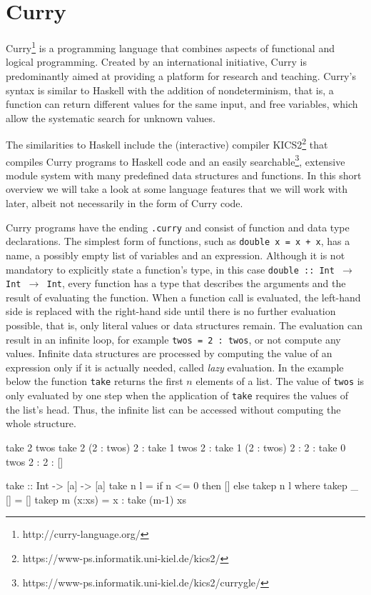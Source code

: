 \documentclass[paper = a4, fleqn, abstract=on, twoside]{scrreprt}
\begin{document}
\section{Curry}
Curry\footnote{http://curry-language.org/} is a programming language that combines aspects of functional and logical programming. Created by an international initiative, Curry is predominantly aimed at providing a platform for research and teaching.\cite{curryintro} Curry's syntax is similar to Haskell with the addition of nondeterminism, that is, a function can return different values for the same input, and free variables, which allow the systematic search for unknown values.
\par
The similarities to Haskell include the (interactive) compiler KICS2\footnote{https://www-ps.informatik.uni-kiel.de/kics2/} that compiles Curry programs to Haskell code and  an easily searchable\footnote{https://www-ps.informatik.uni-kiel.de/kics2/currygle/}, extensive module system with many predefined data structures and functions. In this short overview we will take a look at some language features that we will work with later, albeit not necessarily in the form of Curry code.\\
\par\noindent
Curry programs have the ending \texttt{.curry} and consist of function and data type declarations. The simplest form of functions, such as \texttt{double x = x + x}, has a name, a possibly empty list of variables and an expression. Although it is not mandatory to explicitly state a function's type, in this case \texttt{double :: Int $\rightarrow$ Int $\rightarrow$ Int}, every function has a type that describes the arguments and the result of evaluating the function. When a function call is evaluated, the left-hand side is replaced with the right-hand side until there is no further evaluation possible, that is, only literal values or data structures remain. The evaluation can result in an infinite loop, for example \texttt{twos = 2 : twos}, or not compute any values. Infinite data structures are processed by computing the value of an expression only if it is actually needed, called \textit{lazy} evaluation. In the example below the function \texttt{take} returns the first $n$ elements of a list. The value of \texttt{twos} is only evaluated by one step when the application of \texttt{take} requires the values of the list's head. Thus, the infinite list can be accessed without computing the whole structure.
\begin{flushleft}
	\begin{minipage}[t]{.3 \linewidth}
\begin{haskellcode}
take 2 twos
take 2 (2 : twos)
2 : take 1 twos
2 : take 1 (2 : twos)
2 : 2 : take 0 twos
2 : 2 : []
\end{haskellcode}
\end{minipage}
\hfill
\vrule
\hfill
\begin{minipage}[t]{.65 \linewidth}
\begin{haskellcode}
take :: Int -> [a] -> [a]
take n l = if n <= 0 then [] else takep n l
  where takep _ []     = []
        takep m (x:xs) = x : take (m-1) xs
\end{haskellcode}
\end{minipage}
\end{flushleft}
\end{document}
